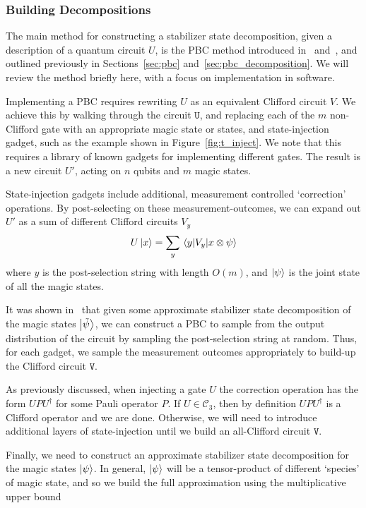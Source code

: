 \subsubsection*{Building Decompositions}
The main method for constructing a stabilizer state decomposition, given a description of a quantum circuit $U$, is the PBC method introduced in~\cite{Bravyi2015} and~\cite{Bravyi2016}, and outlined previously in Sections~\ref{sec:pbc} and~\ref{sec:pbc_decomposition}. We will review the method briefly here, with a focus on implementation in software. \par
Implementing a PBC requires rewriting $U$ as an equivalent Clifford circuit $V$. We achieve this by walking through the circuit $\texttt{U}$, and replacing each of the $m$ non-Clifford gate with an appropriate magic state or states, and state-injection gadget, such as the example shown in Figure~\ref{fig:t_inject}. We note that this requires a library of known gadgets for implementing different gates. The result is a new circuit $U'$, acting on $n$ qubits and $m$ magic states.\par
State-injection gadgets include additional, measurement controlled `correction' operations. By post-selecting on these measurement-outcomes, we can expand out $U'$ as a sum of different Clifford circuits $V_{y}$
\[U\ket{x} = \sum_{y}\matrixel{y}{V_{y}}{x\otimes \psi} \]
where $y$ is the post-selection string with length $O(m)$, and $\ket{\psi}$ is the joint state of all the magic states.\par
It was shown in~\cite{Bravyi2016} that given some approximate stabilizer state decomposition of the magic states $\ket{\tilde{\psi}}$, we can construct a PBC to sample from the output distribution of the circuit by sampling the post-selection string at random. Thus, for each gadget, we sample the measurement outcomes appropriately to build-up the Clifford circuit $\mathtt{V}$.\par
As previously discussed, when injecting a gate $U$ the correction operation has the form $UPU^{\dagger}$ for some Pauli operator $P$. If $U\in\mathcal{C}_{3}$, then by definition $UPU^{\dagger}$ is a Clifford operator and we are done. Otherwise, we will need to introduce additional layers of state-injection until we build an all-Clifford circuit $\mathtt{V}$.\par
Finally, we need to construct an approximate stabilizer state decomposition for the magic states $\ket{\psi}$. In general, $\ket{\psi}$ will be a tensor-product of different `species' of magic state, and so we build the full approximation using the multiplicative upper bound
